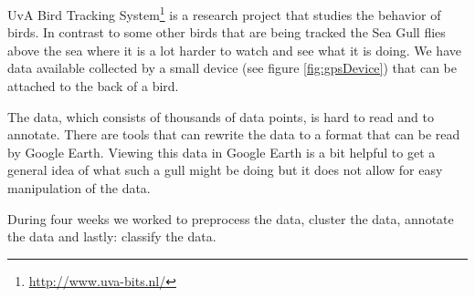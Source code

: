 UvA Bird Tracking System\footnote{\url{http://www.uva-bits.nl/} } is a research 
project that studies the behavior of
birds. 
In contrast to some other birds that are being tracked the Sea Gull flies above the 
sea where it is a lot harder to watch and see what it is doing. We have data available
collected by a small device (see figure \ref{fig:gpsDevice}) that can be attached to 
the back of a bird. 


The data, which consists of thousands of data points, is hard to read and to annotate. 
There are tools that can rewrite the data to a format that can be read by Google Earth. 
Viewing this data in Google Earth is a bit helpful to get a general idea of what such 
a gull might be doing but it does not allow for easy manipulation of the data. 

During four weeks we worked to preprocess the data, cluster the data, annotate the 
data and lastly: classify the data. 


